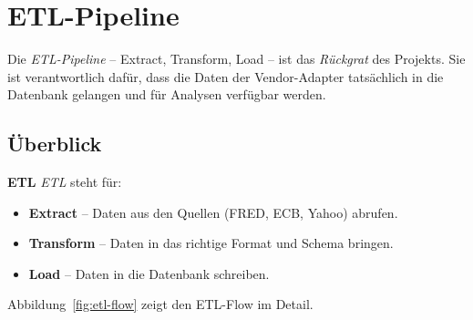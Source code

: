 
\chapter{ETL-Pipeline}

\label{ch:etl}

Die \emph{ETL-Pipeline} -- Extract, Transform, Load -- ist das
\emph{Rückgrat} des Projekts. Sie ist verantwortlich dafür, dass
die Daten der Vendor-Adapter tatsächlich in die Datenbank gelangen
und für Analysen verfügbar werden.

\section{Überblick}

\begin{definition}
\textbf{ETL}
\emph{ETL} steht für:
  \begin{itemize}
    \item \textbf{Extract} -- Daten aus den Quellen (FRED, ECB, Yahoo)
          abrufen.
    \item \textbf{Transform} -- Daten in das richtige Format und Schema
          bringen.
    \item \textbf{Load} -- Daten in die Datenbank schreiben.
  \end{itemize}
\end{definition}

Abbildung~\ref{fig:etl-flow} zeigt den ETL-Flow im Detail.

